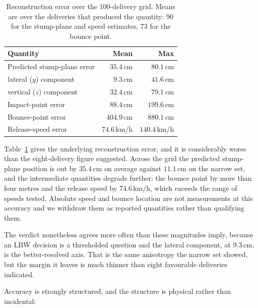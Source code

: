\documentclass[journal]{IEEEtran}
\begin{document}
\begin{table}[!t]
\caption{Reconstruction error over the 100-delivery grid. Means are over the deliveries that
produced the quantity: 90 for the stump-plane and speed estimates, 73 for the bounce point.}
\label{tab:wide_err}
\centering
\begin{tabular}{@{}lrr@{}}
\toprule
\textbf{Quantity} & \textbf{Mean} & \textbf{Max}\\
\midrule
Predicted stump-plane error        & $35.4$\,cm  & $80.1$\,cm\\
\quad lateral ($y$) component      & $9.3$\,cm   & $41.6$\,cm\\
\quad vertical ($z$) component     & $32.4$\,cm  & $79.1$\,cm\\
Impact-point error                 & $88.4$\,cm  & $199.6$\,cm\\
Bounce-point error                 & $404.9$\,cm & $880.1$\,cm\\
Release-speed error                & $74.6$\,km/h & $140.4$\,km/h\\
\bottomrule
\end{tabular}
\end{table}

Table~\ref{tab:wide_err} gives the underlying reconstruction error, and it is considerably worse
than the eight-delivery figure suggested. Across the grid the predicted stump-plane position is out
by $35.4$\,cm on average against $11.1$\,cm on the narrow set, and the intermediate quantities
degrade further: the bounce point by more than four metres and the release speed by $74.6$\,km/h,
which exceeds the range of speeds tested. Absolute speed and bounce location are not measurements
at this accuracy and we withdraw them as reported quantities rather than qualifying them.

The verdict nonetheless agrees more often than these magnitudes imply, because an LBW decision is a
thresholded question and the lateral component, at $9.3$\,cm, is the better-resolved axis. That is
the same anisotropy the narrow set showed, but the margin it leaves is much thinner than eight
favourable deliveries indicated.

Accuracy is strongly structured, and the structure is physical rather than incidental:
\end{document}
